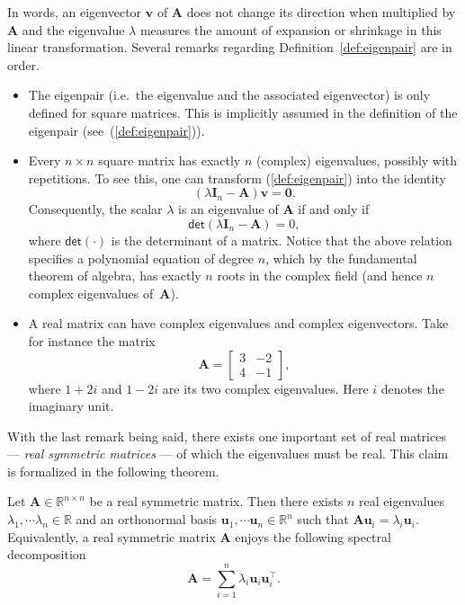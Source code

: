 In words, an eigenvector $\bm{v}$ of $\bm{A}$ does not change its
direction when multiplied by $\bm{A}$ and the eigenvalue $\lambda$
measures the amount of expansion or shrinkage in this linear transformation.
Several remarks regarding Definition~\ref{def:eigenpair} are in
order.
\begin{itemize}
\item The eigenpair (i.e.~the eigenvalue and the associated eigenvector) is only defined
for square matrices. This is implicitly assumed in the definition
of the eigenpair (see~(\ref{def:eigenpair})).
\item Every $n\times n$ square matrix has exactly $n$ (complex) eigenvalues,
possibly with repetitions. To see this, one can transform (\ref{def:eigenpair})
into the identity
\[
\left(\lambda\bm{I}_{n}-\bm{A}\right)\bm{v}=\bm{0}.
\]
Consequently, the scalar $\lambda$ is an eigenvalue of $\bm{A}$
if and only if 
\[
\mathsf{det}\left(\lambda\bm{I}_{n}-\bm{A}\right)=0,
\]
where $\mathsf{det}(\cdot)$ is the determinant of a matrix. Notice that the above relation specifies a polynomial equation of
degree $n$, which by the fundamental theorem of algebra, has exactly
$n$ roots in the complex field (and hence $n$ complex eigenvalues
of~$\bm{A}$).
\item A real matrix can have complex eigenvalues and
complex eigenvectors. Take for instance the matrix
\[
\bm{A}=\left[\begin{array}{cc}
3 & -2\\
4 & -1
\end{array}\right],
\]
where $1+2i$ and $1-2i$ are its two complex eigenvalues. Here $i$
denotes the imaginary unit.
\end{itemize}
With the last remark being said, there exists one important set of
real matrices --- \emph{real symmetric matrices} --- of which the eigenvalues
must be real. This claim is formalized in the following theorem.  

\begin{theorem}\label{thm:spectral} Let $\bm{A}\in\mathbb{R}^{n\times n}$
be a real symmetric matrix. Then there exists $n$ real eigenvalues
$\lambda_{1},\cdots\lambda_{n}\in\mathbb{R}$ and an orthonormal basis
$\bm{u}_{1},\cdots\bm{u}_{n}\in\mathbb{R}^{n}$ such that $\bm{A}\bm{u}_{i}=\lambda_{i}\bm{u}_{i}$.
Equivalently, a real symmetric matrix $\bm{A}$ enjoys the following
spectral decomposition 
\begin{equation}
\bm{A}=\sum_{i=1}^{n}\lambda_{i}\bm{u}_{i}\bm{u}_{i}^{\top}.\label{eq:spectral-decomposition-summation-form}
\end{equation}

\end{theorem}

